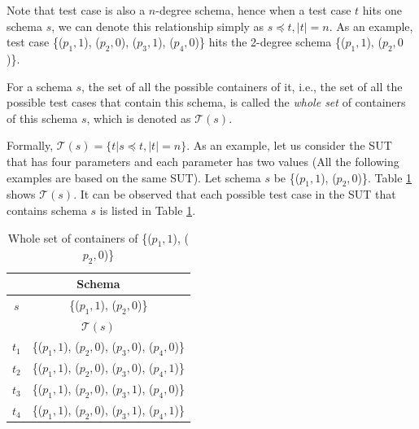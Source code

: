 Note that test case is also a $n$-degree schema, hence when a test case $t$ hits one schema $s$, we can denote this relationship simply as $s \preceq t, |t| = n$. As an example, test case \{($p_{1}, 1$), ($p_{2}, 0$), ($p_{3}, 1$), ($p_{4}, 0$)\} hits the 2-degree schema \{($p_{1}, 1$), ($p_{2}, 0$)\}.

\begin{definition} \label{de:alltests}
 For a schema $s$, the set of all the possible containers of it, i.e., the set of all the possible test cases that contain this schema, is called the \emph{whole set} of containers of this schema $s$, which is denoted as $\mathcal{T}(s)$.
\end{definition}

Formally, $\mathcal{T}(s) = \{ t | s \preceq t, |t| = n\}$. As an example, let us consider the SUT that has four parameters and each parameter has two values (All the following examples are based on the same SUT). Let schema $s$ be \{($p_{1}, 1$), ($p_{2}, 0$)\}. Table \ref{ex:wholecontainer} shows $\mathcal{T}(s)$.  It can be observed that each possible test case in the SUT that contains schema $s$ is listed in Table \ref{ex:wholecontainer}.


\begin{table}[htbp]
  \centering
  \caption{Whole set of containers of \{($p_{1}, 1$), ($p_{2}, 0$)\}}
  \label{ex:wholecontainer}
    \begin{tabular}{|c|c|}\hline
  \multicolumn{2}{|c|}{ \textbf{Schema}} \\ \hline
   $s$ & \{($p_{1}, 1$), ($p_{2}, 0$)\} \\ \hline
  \multicolumn{2}{|c|}{ \textbf{ $\mathcal{T}(s)$ }}\\ \hline
    $t_{1}$ &   \{($p_{1}, 1$), ($p_{2}, 0$), ($p_{3}, 0$), ($p_{4}, 0$)\} \\
    $t_{2}$ &   \{($p_{1}, 1$), ($p_{2}, 0$), ($p_{3}, 0$), ($p_{4}, 1$)\} \\
    $t_{3}$ &   \{($p_{1}, 1$), ($p_{2}, 0$), ($p_{3}, 1$), ($p_{4}, 0$)\} \\
    $t_{4}$ &   \{($p_{1}, 1$), ($p_{2}, 0$), ($p_{3}, 1$), ($p_{4}, 1$)\} \\ \hline
    \end{tabular}
\end{table}%



